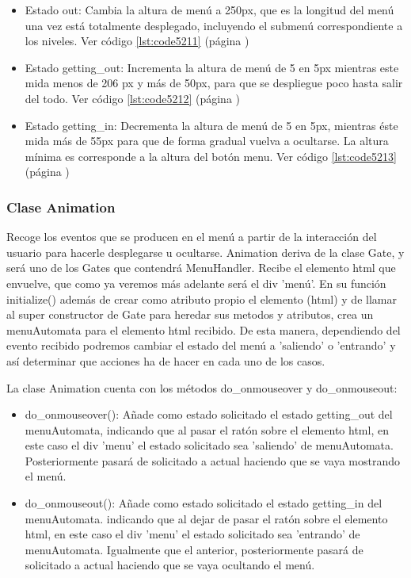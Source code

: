 \begin{itemize}
 \item Estado out: Cambia la altura de menú a 250px, que es la longitud del menú una vez está totalmente desplegado, incluyendo el submenú correspondiente a los 
 niveles. Ver código \ref{lst:code5211} (página \pageref{lst:code5211})

 \item Estado getting\_out: Incrementa la altura de menú de 5 en 5px  mientras este mida menos de 206 px y más de 50px, para que se despliegue poco hasta salir del todo.
 Ver código \ref{lst:code5212} (página \pageref{lst:code5212})

 \item Estado getting\_in: Decrementa la altura de menú de 5 en 5px, mientras éste mida  más de 55px para que de forma gradual vuelva a ocultarse. 
 La altura mínima es corresponde a la altura del botón menu. Ver código \ref{lst:code5213} (página \pageref{lst:code5213})
\end{itemize}


\subsubsection{Clase Animation}
\label{subsubsection:animation}

Recoge los eventos que se producen en el menú a partir de la interacción del usuario para hacerle desplegarse u ocultarse. 
Animation deriva de la clase Gate, y será uno de los Gates que contendrá MenuHandler.
Recibe el elemento html que envuelve, que como ya veremos más adelante será el div 'menú'.
En su función initialize() además de crear como atributo propio el elemento (html) y de llamar al super constructor de Gate para heredar
sus metodos y atributos, crea un menuAutomata para el elemento html recibido. De esta manera, dependiendo del evento recibido podremos 
cambiar el estado del menú a 'saliendo' o 'entrando' y así determinar que acciones ha de hacer en cada uno de los casos. 

La clase Animation cuenta con los métodos do\_onmouseover y do\_onmouseout:
\begin{itemize}
 \item do\_onmouseover(): Añade como estado solicitado el estado getting\_out del menuAutomata, indicando que al pasar el ratón sobre el 
 elemento html, en este caso el div 'menu' el estado solicitado sea 'saliendo' de menuAutomata. Posteriormente pasará de solicitado a actual 
 haciendo que se vaya mostrando el menú.  

 \item do\_onmouseout(): Añade como estado solicitado el estado getting\_in del menuAutomata.
indicando que al dejar de pasar el ratón sobre el elemento html, en este caso el div 'menu' el estado solicitado sea 'entrando' de 
menuAutomata.  Igualmente que el anterior, posteriormente pasará de solicitado a actual haciendo que se vaya ocultando el menú. 
\end{itemize}

